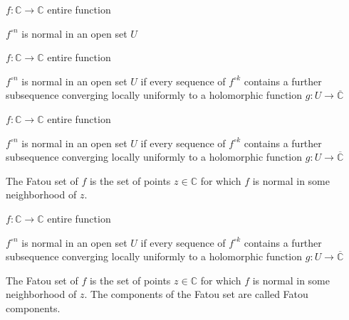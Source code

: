 \documentclass{beamer}
\begin{document}
\begin{frame}

$f: \mathbb{C} \rightarrow \mathbb{C}$ entire function

\vspace{2.5mm}


$f^{\circ n}$ is normal in an open set $U$ 

\end{frame}



\begin{frame}

$f: \mathbb{C} \rightarrow \mathbb{C}$ entire function

\vspace{2.5mm}

$f^{\circ n}$ is normal in an open set $U$ if every sequence of $f^{\circ k}$ contains a further subsequence converging locally uniformly to a holomorphic function $g: U \rightarrow \overline{\mathbb{C}}$

\end{frame}





\begin{frame}

$f: \mathbb{C} \rightarrow \mathbb{C}$ entire function

\vspace{2.5mm}

$f^{\circ n}$ is normal in an open set $U$ if every sequence of $f^{\circ k}$ contains a further subsequence converging locally uniformly to a holomorphic function $g: U \rightarrow \overline{\mathbb{C}}$

\vspace{2.5mm}

The Fatou set of $f$ is the set of points $z \in \mathbb{C}$ for which $f$ is normal in some neighborhood of $z$.

\end{frame}



\begin{frame}

$f: \mathbb{C} \rightarrow \mathbb{C}$ entire function

\vspace{2.5mm}

$f^{\circ n}$ is normal in an open set $U$ if every sequence of $f^{\circ k}$ contains a further subsequence converging locally uniformly to a holomorphic function $g: U \rightarrow \overline{\mathbb{C}}$

\vspace{2.5mm}

The Fatou set of $f$ is the set of points $z \in \mathbb{C}$ for which $f$ is normal in some neighborhood of $z$. The components of the Fatou set are called Fatou components.

\end{frame}
\end{document}
